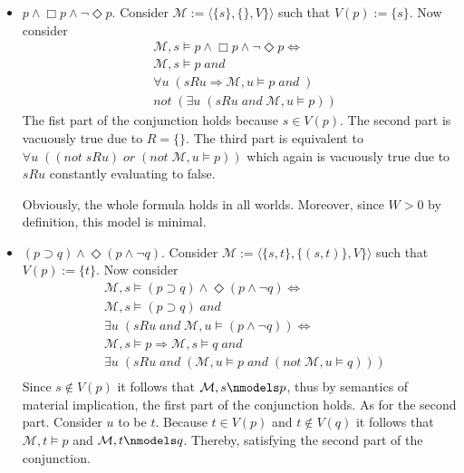 \documentclass[11pt,a4paper]{article}
\newcommand{\lto}{\supset}
\newcommand{\some}{\Diamond}
\newcommand{\all}{\Box}
\newcommand{\sand}{\; and \;}
\newcommand{\sor}{ \; or \;}
\newcommand{\sneg}{not \;}
\newcommand{\sto}{\Rightarrow}
\begin{document}
\begin{itemize}
\item $p \land \all p \land \neg \some p$. Consider $\mathcal{M}:=\langle \{s\}, \{\}, V\}\rangle$ such that $V(p):=\{s\}$. Now consider
\begin{equation*}
\begin{split}
&\mathcal{M}, s \models p \land \all p \land \neg \some p \iff \\
&\mathcal{M}, s \models p \sand  \\
&\forall u \; (sRu \sto \mathcal{M}, u \models p \sand ) \\
&\sneg( \exists u \;( sRu \sand \mathcal{M}, u \models p))
\end{split}
\end{equation*}
The fist part of the conjunction holds because $s \in V(p)$. The second part is vacuously true due to $R=\{\}$. The third part is equivalent to  $\forall u \; ((\sneg sRu) \sor (\sneg \mathcal{M}, u \models p))$ which again is vacuously true due to $sRu$ constantly evaluating to false. 


Obviously, the whole formula holds in all worlds. Moreover, since $W>0$  by definition, this model is minimal.


\item $(p \lto q) \land \some (p \land \neg q)$. Consider $\mathcal{M}:=\langle \{s,t\}, \{(s,t)\}, V\}\rangle$ such that $V(p):=\{t\}$. Now consider
\begin{equation*}
\begin{split}
&\mathcal{M}, s \models (p \lto q) \land \some (p \land \neg q)  \iff \\
&\mathcal{M}, s \models (p \lto q) \sand  \\
&\exists u \; (sRu \sand \mathcal{M}, u \models (p \land \neg q)) \iff \\
&\mathcal{M}, s \models p \sto \mathcal{M}, s \models q \sand  \\
& \exists u \; (sRu \sand (\mathcal{M}, u \models p \sand (\sneg \mathcal{M}, u \models q))) \\
\end{split}
\end{equation*}
Since $s \notin V(p)$ it follows that $\mathcal{M}, s \nmodels p $, thus by semantics of material implication, the first part of the conjunction holds. As for the second part. Consider $u$ to be $t$. Because $t\in V(p)$ and $t \notin V(q)$ it follows that  $\mathcal{M}, t \models p$ and $\mathcal{M}, t \nmodels q $. Thereby, satisfying the second part of the conjunction.


\end{itemize}
\end{document}
